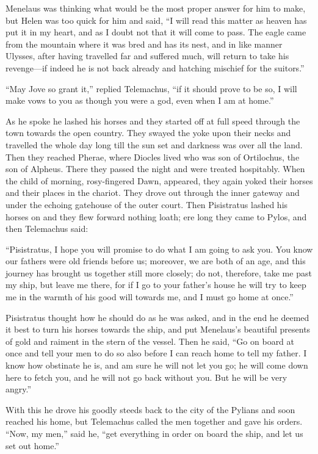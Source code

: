 Menelaus was thinking what would be the most proper answer for him to make, but
Helen was too quick for him and said, “I will read this matter as heaven has
put it in my heart, and as I doubt not that it will come to pass. The eagle
came from the mountain where it was bred and has its nest, and in like manner
Ulysses, after having travelled far and suffered much, will return to take his
revenge—if indeed he is not back already and hatching mischief for the
suitors.”

“May Jove so grant it,” replied Telemachus, “if it should prove to be so, I
will make vows to you as though you were a god, even when I am at home.”

As he spoke he lashed his horses and they started off at full speed through the
town towards the open country. They swayed the yoke upon their necks and
travelled the whole day long till the sun set and darkness was over all the
land. Then they reached Pherae, where Diocles lived who was son of Ortilochus,
the son of Alpheus. There they passed the night and were treated hospitably.
When the child of morning, rosy-fingered Dawn, appeared, they again yoked their
horses and their places in the chariot. They drove out through the inner
gateway and under the echoing gatehouse of the outer court. Then Pisistratus
lashed his horses on and they flew forward nothing loath; ere long they came to
Pylos, and then Telemachus said:

“Pisistratus, I hope you will promise to do what I am going to ask you. You
know our fathers were old friends before us; moreover, we are both of an age,
and this journey has brought us together still more closely; do not, therefore,
take me past my ship, but leave me there, for if I go to your father’s house he
will try to keep me in the warmth of his good will towards me, and I must go
home at once.”

Pisistratus thought how he should do as he was asked, and in the end he deemed
it best to turn his horses towards the ship, and put Menelaus’s beautiful
presents of gold and raiment in the stern of the vessel. Then he said, “Go on
board at once and tell your men to do so also before I can reach home to tell
my father. I know how obstinate he is, and am sure he will not let you go; he
will come down here to fetch you, and he will not go back without you. But he
will be very angry.”

With this he drove his goodly steeds back to the city of the Pylians and soon
reached his home, but Telemachus called the men together and gave his orders.
“Now, my men,” said he, “get everything in order on board the ship, and let us
set out home.”

